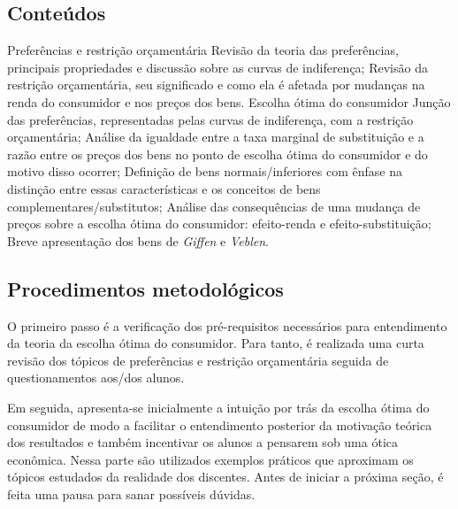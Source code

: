 \documentclass[
	article,			%
	12pt,				%
	twoside,			%
	a4paper,			%
	section=TITLE,		%
	english,			%
	brazil,				%
	sumario=tradicional
]{abntex2-modelo-plano-de-aula}
\begin{document}
\clearpage%

\begin{snugshade}
	\section{\textbf{Conteúdos}} %
\end{snugshade}

\begin{outline}
    \1 Preferências e restrição orçamentária
        \2 Revisão da teoria das preferências, principais propriedades e discussão sobre as curvas de indiferença;
        \2 Revisão da restrição orçamentária, seu significado e como ela é afetada por mudanças na renda do consumidor e nos preços dos bens.
	\1 Escolha ótima do consumidor
		\2 Junção das preferências, representadas pelas curvas de indiferença, com a restrição orçamentária;
		\2 Análise da igualdade entre a taxa marginal de substituição e a razão entre os preços dos bens no ponto de escolha ótima do consumidor e do motivo disso ocorrer;
		\2 Definição de bens normais/inferiores com ênfase na distinção entre essas características e os conceitos de bens complementares/substitutos;
		\2 Análise das consequências de uma mudança de preços sobre a escolha ótima do consumidor: efeito-renda e efeito-substituição;
		\2 Breve apresentação dos bens de \textit{Giffen} e \textit{Veblen}.
\end{outline}


\begin{snugshade}
	\section{\textbf{Procedimentos metodológicos}} %
\end{snugshade}

O primeiro passo é a verificação dos pré-requisitos necessários para entendimento da teoria da escolha ótima do consumidor. Para tanto, é realizada uma curta revisão dos tópicos de preferências e restrição orçamentária seguida de questionamentos aos/dos alunos.

Em seguida, apresenta-se inicialmente a intuição por trás da escolha ótima do consumidor de modo a facilitar o entendimento posterior da motivação teórica dos resultados e também incentivar os alunos a pensarem sob uma ótica econômica. Nessa parte são utilizados exemplos práticos que aproximam os tópicos estudados da realidade dos discentes. Antes de iniciar a próxima seção, é feita uma pausa para sanar possíveis dúvidas.
\end{document}
